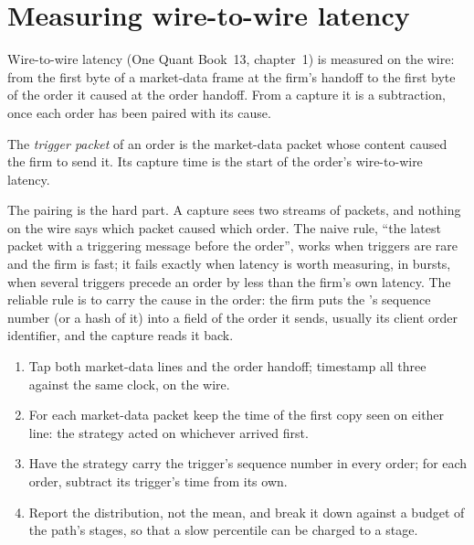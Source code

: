 \label{lst:nw:capturing-and-monitoring-the-network:pcap}

\section{Measuring wire-to-wire latency}

Wire-to-wire latency (One Quant Book~13, chapter~1) is measured on the wire: from the first byte of a market-data frame at the firm's
handoff to the first byte of the order it caused at the order handoff. From a capture it is a subtraction, once each order has been
paired with its cause.

\begin{definition}\label{def:nw:capturing-and-monitoring-the-network:trigger}
The \emph{trigger packet} of an order is the market-data packet whose content caused the firm to send it. Its
capture time is the start of the order's wire-to-wire latency.
\end{definition}

The pairing is the hard part. A capture sees two streams of packets, and nothing on the wire says which packet caused which order.
The naive rule, ``the latest packet with a triggering message before the order'', works when triggers are rare and the firm is fast;
it fails exactly when latency is worth measuring, in bursts, when several triggers precede an order by less than the firm's own latency.
The reliable rule is to carry the cause in the order: the firm puts the 's sequence number (or a hash of it) into a field
of the order it sends, usually its client order identifier, and the capture reads it back.

\begin{method}\label{met:nw:capturing-and-monitoring-the-network:w2w}
\begin{enumerate}
\item Tap both market-data lines and the order handoff; timestamp all three against the same clock, on the wire.
\item For each market-data packet keep the time of the first copy seen on either line: the strategy acted on whichever arrived first.
\item Have the strategy carry the trigger's sequence number in every order; for each order, subtract its trigger's time from its own.
\item Report the distribution, not the mean, and break it down against a budget of the path's stages, so that a slow percentile can be
  charged to a stage.
\end{enumerate}
\end{method}

